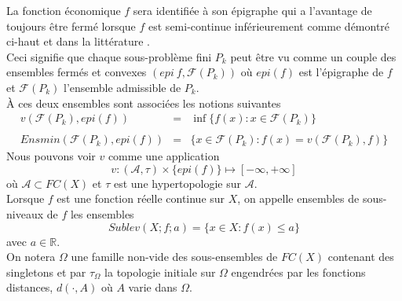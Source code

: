 \documentclass[11pt]{report}
\theoremstyle{styletheorem}
\theoremstyle{styledef}
\theoremstyle{remark}
\newcommand{\R}{\ensuremath{\mathbb{R}}}
\newcommand{\Fr}{\ensuremath{\mathcal{F}}  }
\newcommand{\Pk}{\ensuremath{P_k}  }
\begin{document}
	La fonction économique $f$ sera identifiée à son épigraphe qui a l'avantage de toujours être fermé lorsque $f$ est semi-continue inférieurement comme démontré ci-haut et dans la littérature \cite{b21, b8}.\\
	
	Ceci signifie que chaque sous-problème fini $P_k$ peut être vu comme un couple des ensembles fermés et convexes $(epi\ f, \Fr (\Pk))$ où $epi (f)$ est l'épigraphe de $f$ et $\Fr(\Pk)$ l'ensemble admissible de $P_k$.\\
	À ces deux ensembles sont associées les notions suivantes 
	\begin{equation}\label{key}
		\begin{array}{lcl}
			v(\Fr (\Pk),epi (f)) &=& \inf\lbrace f(x) \colon x \in \Fr (\Pk)\rbrace \\ \\
			Ensmin (\Fr (\Pk),epi (f)) &= &\lbrace x \in \Fr (\Pk) \colon f(x) = v(\Fr (\Pk),f)\rbrace 
		\end{array}
	\end{equation}
	Nous pouvons voir $v$ comme une application $$v\colon (\mathcal{A}, \tau) \times \lbrace epi (f) \rbrace \mapsto [-\infty, +\infty]$$
	où $\mathcal{A} \subset FC(X)$ et $\tau$ est une hypertopologie sur $\mathcal{A}$.\\
	Lorsque $f$ est une fonction réelle continue sur $X$, on appelle ensembles de sous-niveaux de $f$ les ensembles $$Sublev(X;f;a) = \lbrace x \in X \colon f(x) \leq a \rbrace$$
	avec $a \in \R$.\\
	On notera $\Omega$ une famille non-vide des sous-ensembles de $FC(X)$ contenant des singletons et par $\tau_\Omega$ la topologie initiale sur $\Omega$ engendrées par les fonctions distances, $d(\cdot, A)$ où $A$ varie dans $\Omega$.
	
\end{document}
